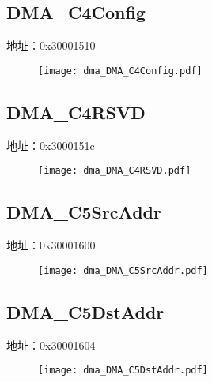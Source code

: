 \subsection{DMA\_C4Config}
\label{dma-DMA-C4Config}
地址：0x30001510
 \begin{figure}[H]
\texttt{[image: dma\_DMA\_C4Config.pdf]}
\end{figure}

\subsection{DMA\_C4RSVD}
\label{dma-DMA-C4RSVD}
地址：0x3000151c
 \begin{figure}[H]
\texttt{[image: dma\_DMA\_C4RSVD.pdf]}
\end{figure}

\subsection{DMA\_C5SrcAddr}
\label{dma-DMA-C5SrcAddr}
地址：0x30001600
 \begin{figure}[H]
\texttt{[image: dma\_DMA\_C5SrcAddr.pdf]}
\end{figure}

\subsection{DMA\_C5DstAddr}
\label{dma-DMA-C5DstAddr}
地址：0x30001604
 \begin{figure}[H]
\texttt{[image: dma\_DMA\_C5DstAddr.pdf]}
\end{figure}


